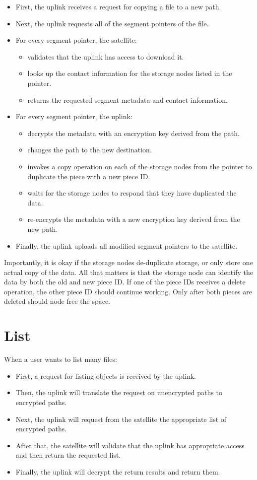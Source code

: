 \documentclass[11pt,fleqn,openany]{book}
\begin{document}
\begin{itemize}
\item First, the uplink receives a request for copying a file to a new path.
\item Next, the uplink requests all of the segment pointers of the file.
\item For every segment pointer, the satellite:
  \begin{itemize}
  \item validates that the uplink has access to download it.
  \item looks up the contact information for the storage nodes listed in the
    pointer.
  \item returns the requested segment metadata and contact information.
  \end{itemize}
\item For every segment pointer, the uplink:
  \begin{itemize}
  \item decrypts the metadata with an encryption key derived from the path.
  \item changes the path to the new destination.
  \item invokes a copy operation on each of the storage nodes from the pointer
    to duplicate the piece with a new piece ID.
  \item waits for the storage nodes to respond that they have duplicated the
    data.
  \item re-encrypts the metadata with a new encryption key derived from the
    new path.
  \end{itemize}
\item Finally, the uplink uploads all modified segment pointers to the satellite.
\end{itemize}

Importantly, it is okay if the storage nodes de-duplicate storage, or only
store one actual copy of the data. All that matters is that the storage node
can identify the data by both the old and new piece ID. If one of the piece
IDs receives a delete operation, the other piece ID should continue working.
Only after both pieces are deleted should node free the space.

\section{List}

When a user wants to list many files:

\begin{itemize}
\item First, a request for listing objects is received by the uplink.
\item Then, the uplink will translate the request on unencrypted paths to encrypted
  paths.
\item Next, the uplink will request from the satellite the appropriate list of
  encrypted paths.
\item After that, the satellite will validate that the uplink has appropriate access
  and then return the requested list.
\item Finally, the uplink will decrypt the return results and return them.
\end{itemize}
\end{document}
